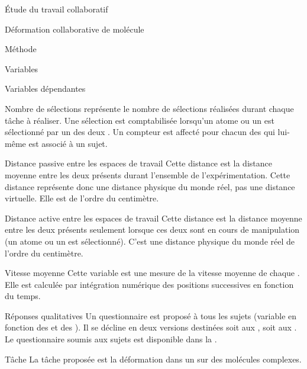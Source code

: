 \documentclass[myfrancais]{mythesis}
\begin{document}
\begin{mypart}{Étude du travail collaboratif}
\begin{mychapter}{Déformation collaborative de molécule}
\begin{mysection}{Méthode}
\begin{mysubsection}{Variables}
\begin{mysubsubsection}{Variables dépendantes}
\begin{myparagraph}{ Nombre de sélections}
							 représente le nombre de sélections réalisées durant chaque tâche à réaliser.
							Une sélection est comptabilisée lorsqu'un atome ou un  est sélectionné par un des deux .
							Un compteur est affecté pour chacun des  qui lui-même est associé à un sujet.
						\end{myparagraph}
						\begin{myparagraph}{ Distance passive entre les espaces de travail}
							Cette distance est la distance moyenne entre les deux  présents durant l'ensemble de l'expérimentation.
							Cette distance représente donc une distance physique du monde réel, pas une distance virtuelle.
							Elle est de l'ordre du centimètre.
						\end{myparagraph}
						\begin{myparagraph}{ Distance active entre les espaces de travail}
							Cette distance est la distance moyenne entre les deux  présents seulement lorsque ces deux  sont en cours de manipulation (un atome ou un  est sélectionné).
							C'est une distance physique du monde réel de l'ordre du centimètre.
						\end{myparagraph}
						\begin{myparagraph}{ Vitesse moyenne}
							Cette variable est une mesure de la vitesse moyenne de chaque .
							Elle est calculée par intégration numérique des positions successives en fonction du temps.
						\end{myparagraph}
						\begin{myparagraph}{ Réponses qualitatives}
							Un questionnaire est proposé à tous les sujets (variable en fonction des  et des ).
							Il se décline en deux versions destinées soit aux , soit aux .
							Le questionnaire soumis aux sujets est disponible dans la .
						\end{myparagraph}
					\end{mysubsubsection}
				\end{mysubsection}
				\begin{mysubsection}[sse-exp2-Tache]{Tâche}
					La tâche proposée est la déformation dans un  sur des molécules complexes.


\end{mysubsection}
\end{mysection}
\end{mychapter}
\end{mypart}
\end{document}

